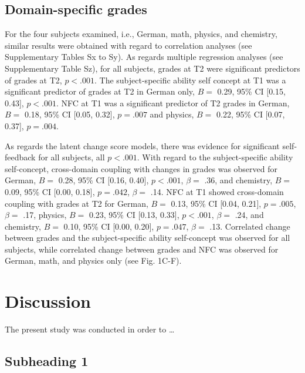 \documentclass[
  man]{apa6}
\begin{document}
\hypertarget{domain-specific-grades}{%
\subsection{Domain-specific grades}\label{domain-specific-grades}}

For the four subjects examined, i.e., German, math, physics, and chemistry, similar results were obtained with regard to correlation analyses (see Supplementary Tables Sx to Sy). As regards multiple regression analyses (see Supplementary Table Sz), for all subjects, grades at T2 were significant predictors of grades at T2, \(p<.001\). The subject-specific ability self concept at T1 was a significant predictor of grades at T2 in German only, \(B=\) 0.29, 95\% CI {[}0.15, 0.43{]}, \(p< .001\). NFC at T1 was a significant predictor of T2 grades in German, \(B=\) 0.18, 95\% CI {[}0.05, 0.32{]}, \(p=.007\) and physics, \(B=\) 0.22, 95\% CI {[}0.07, 0.37{]}, \(p=.004\).

As regards the latent change score models, there was evidence for significant self-feedback for all subjects, all \(p<.001\). With regard to the subject-specific ability self-concept, cross-domain coupling with changes in grades was observed for German, \(B=\) 0.28, 95\% CI {[}0.16, 0.40{]}, \(p< .001\), \(\beta=\) .36, and chemistry, \(B=\) 0.09, 95\% CI {[}0.00, 0.18{]}, \(p=.042\), \(\beta=\) .14. NFC at T1 showed cross-domain coupling with grades at T2 for German, \(B=\) 0.13, 95\% CI {[}0.04, 0.21{]}, \(p=.005\), \(\beta=\) .17, physics, \(B=\) 0.23, 95\% CI {[}0.13, 0.33{]}, \(p< .001\), \(\beta=\) .24, and chemistry, \(B=\) 0.10, 95\% CI {[}0.00, 0.20{]}, \(p=.047\), \(\beta=\) .13. Correlated change between grades and the subject-specific ability self-concept was observed for all subjects, while correlated change between grades and NFC was observed for German, math, and physics only (see Fig. 1C-F).

\hypertarget{discussion}{%
\section{Discussion}\label{discussion}}

The present study was conducted in order to \ldots{}

\hypertarget{subheading-1}{%
\subsection{Subheading 1}\label{subheading-1}}
\end{document}
